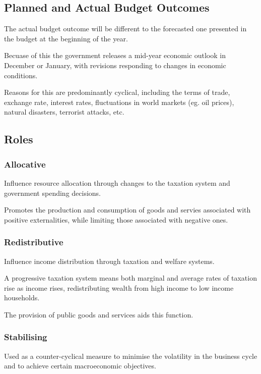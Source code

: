 \documentclass[a4paper,11pt]{article}
\begin{document}
\subsection{Planned and Actual Budget Outcomes}

The actual budget outcome will be different to the forecasted one presented in
the budget at the beginning of the year.

Becuase of this the government releases a mid-year economic outlook in December
or January, with revisions responding to changes in economic conditions.

Reasons for this are predominantly cyclical, including the terms of trade,
exchange rate, interest rates, fluctuations in world markets (eg. oil prices),
natural disasters, terrorist attacks, etc.


\subsection{Roles}

\subsubsection{Allocative}

Influence resource allocation through changes to the taxation system and
government spending decisions.

Promotes the production and consumption of goods and servies associated with
positive externalities, while limiting those associated with negative ones.

\subsubsection{Redistributive}

Influence income distribution through taxation and welfare systems.

A progressive taxation system means both marginal and average rates of taxation
rise as income rises, redistributing wealth from high income to low income
households.

The provision of public goods and services aids this function.

\subsubsection{Stabilising}

Used as a counter-cyclical measure to minimise the volatility in the business
cycle and to achieve certain macroeconomic objectives.
\end{document}
